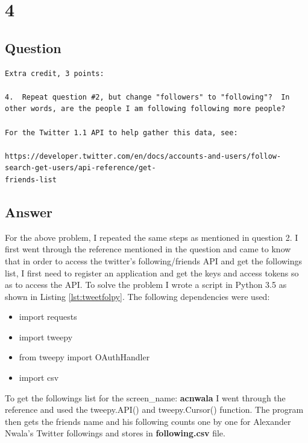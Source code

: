 \documentclass[letterpaper,11pt]{article}
\begin{document}

\section*{4}

\subsection*{Question}

\begin{verbatim}
Extra credit, 3 points:

4.  Repeat question #2, but change "followers" to "following"?  In
other words, are the people I am following following more people?

For the Twitter 1.1 API to help gather this data, see:

https://developer.twitter.com/en/docs/accounts-and-users/follow-search-get-users/api-reference/get-
friends-list

\end{verbatim}

\clearpage
\subsection*{Answer}

 For the above problem, I repeated the same steps as mentioned in question 2.  I first went through the reference \cite{followingref}  mentioned in the question and came to know that in order to access the twitter's following/friends API and get the followings  list, I first need to register an application and get the keys and access tokens so as to access the API.
To solve the problem I wrote a script in Python 3.5 as shown in Listing \ref{lst:tweetfolpy}. The following dependencies were used:

\begin{itemize}
    \item import requests
    \item import tweepy
    \item from tweepy import OAuthHandler
    \item import csv
\end{itemize}

To get the followings list for the screen\_name: \textbf{acnwala} I went through the reference \cite{apiref} and used the tweepy.API() and  tweepy.Cursor() function. The program then gets the friends name and his following counts one by one for Alexander Nwala’s Twitter followings and stores in \textbf{following.csv} file.
\end{document}
